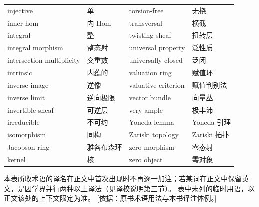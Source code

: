 \begin{longtable}{@{}>{\raggedright\arraybackslash}p{}>{\raggedright\arraybackslash}p{}>{\raggedright\arraybackslash}p{}>{\raggedright\arraybackslash}p{}@{}}
injective & 单 & torsion-free & 无挠 \\
inner hom & 内 Hom & transversal & 横截 \\
integral & 整 & twisting sheaf & 扭转层 \\
integral morphism & 整态射 & universal property & 泛性质 \\
intersection multiplicity & 交重数 & universally closed & 泛闭 \\
intrinsic & 内蕴的 & valuation ring & 赋值环 \\
inverse image & 逆像 & valuative criterion & 赋值判别法 \\
inverse limit & 逆向极限 & vector bundle & 向量丛 \\
invertible sheaf & 可逆层 & very ample & 极丰沛 \\
irreducible & 不可约 & Yoneda lemma & Yoneda 引理 \\
isomorphism & 同构 & Zariski topology & Zariski 拓扑 \\
Jacobson ring & 雅各布森环 & zero morphism & 零态射 \\
kernel & 核 & zero object & 零对象 \\
\end{longtable}

\begin{yizhu}
本表所收术语的译名在正文中首次出现时不再逐一加注；若某词在正文中保留英文，是因学界并行两种以上译法（见译校说明第三节）。
表中未列的临时用语，以正文该处的上下文限定为准。
[依据：原书术语用法与本书译注体例。]
\end{yizhu}
